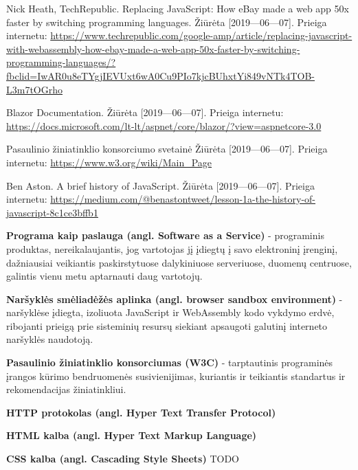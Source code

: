 \documentclass{VUMIFPSkursinis}
\begin{document}
\begin{thebibliography}{99}
Nick Heath, TechRepublic. Replacing JavaScript: How eBay made a web app 50x faster by switching programming languages. Žiūrėta [2019—06—07].  Prieiga internetu: \url{https://www.techrepublic.com/google-amp/article/replacing-javascript-with-webassembly-how-ebay-made-a-web-app-50x-faster-by-switching-programming-languages/?fbclid=IwAR0u8eTYgjIEVUxt6wA0Cu9PIo7kjcBUhxtYi849vNTk4TOB-L3m7tOGrho}

Blazor Documentation. Žiūrėta [2019—06—07].  Prieiga internetu: \url{https://docs.microsoft.com/lt-lt/aspnet/core/blazor/?view=aspnetcore-3.0}

Pasaulinio žiniatinklio konsorciumo svetainė Žiūrėta [2019—06—07].  Prieiga internetu: \url{https://www.w3.org/wiki/Main_Page}

Ben Aston. A brief history of JavaScript. Žiūrėta [2019—06—07].  Prieiga internetu: \url{https://medium.com/@benastontweet/lesson-1a-the-history-of-javascript-8c1ce3bffb1}
\end{thebibliography}


\textbf{Programa kaip paslauga (angl. Software as a Service)} - programinis produktas, nereikalaujantis, jog vartotojas jį įdiegtų į savo elektroninį įrenginį, dažniausiai veikiantis paskirstytuose dalykiniuose serveriuose, duomenų centruose, galintis vienu metu aptarnauti daug vartotojų.

\textbf{Naršyklės smėliadėžės aplinka (angl. browser sandbox environment)} - naršyklėse įdiegta, izoliuota JavaScript ir WebAssembly kodo vykdymo erdvė, ribojanti prieigą prie sisteminių resursų siekiant apsaugoti galutinį interneto naršyklės naudotoją.

\textbf{Pasaulinio žiniatinklio konsorciumas (W3C)} - tarptautinis programinės įrangos kūrimo bendruomenės susivienijimas, kuriantis ir teikiantis standartus ir rekomendacijas žiniatinkliui. \cite{W3C19}

\textbf{HTTP protokolas (angl. Hyper Text Transfer Protocol)}

\textbf{HTML kalba (angl. Hyper Text Markup Language)}

\textbf{CSS kalba (angl. Cascading Style Sheets)}
TODO
\end{document}
